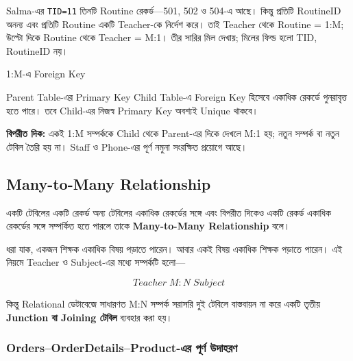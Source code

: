 

Salma-এর \texttt{TID=11} তিনটি Routine রেকর্ড—501, 502 ও 504-এ
আছে। কিন্তু প্রতিটি RoutineID অনন্য এবং প্রতিটি Routine একটি Teacher-কে
নির্দেশ করে। তাই Teacher থেকে Routine = 1:M; উল্টো দিকে Routine থেকে
Teacher = M:1। তীর সারির মিল দেখায়; মিলের ফিল্ড হলো TID, RoutineID নয়।

\begin{keypointbox}{1:M-এ Foreign Key}

Parent Table-এর Primary Key Child Table-এ Foreign Key হিসেবে
একাধিক রেকর্ডে পুনরাবৃত্ত হতে পারে। তবে Child-এর নিজস্ব Primary Key অবশ্যই Unique থাকবে।

\end{keypointbox}



\textbf{বিপরীত দিক:} একই 1:M সম্পর্ককে Child থেকে Parent-এর দিকে দেখলে M:1 হয়; নতুন সম্পর্ক বা নতুন টেবিল তৈরি হয় না। Staff ও Phone-এর পূর্ণ নমুনা সংরক্ষিত প্রয়োগে আছে।

\subsection{Many-to-Many Relationship}

\begin{definitionbox}{}

একটি টেবিলের একটি রেকর্ড অন্য টেবিলের একাধিক রেকর্ডের সঙ্গে
এবং বিপরীত দিকেও একটি রেকর্ড একাধিক রেকর্ডের সঙ্গে সম্পর্কিত হতে
পারলে তাকে \textbf{Many-to-Many Relationship} বলে।

\end{definitionbox}


ধরা যাক, একজন শিক্ষক একাধিক বিষয় পড়াতে পারেন। আবার একই বিষয় একাধিক শিক্ষক পড়াতে পারেন। এই নিয়মে Teacher ও Subject-এর মধ্যে সম্পর্কটি হলো---

\[
\boxed{
Teacher \; M:N \; Subject
}
\]


কিন্তু Relational ডেটাবেজে সাধারণত M:N সম্পর্ক সরাসরি
দুই টেবিলে বাস্তবায়ন না করে একটি তৃতীয়
\textbf{Junction বা Joining টেবিল} ব্যবহার করা হয়।



\subsubsection{Orders–OrderDetails–Product-এর পূর্ণ উদাহরণ}

